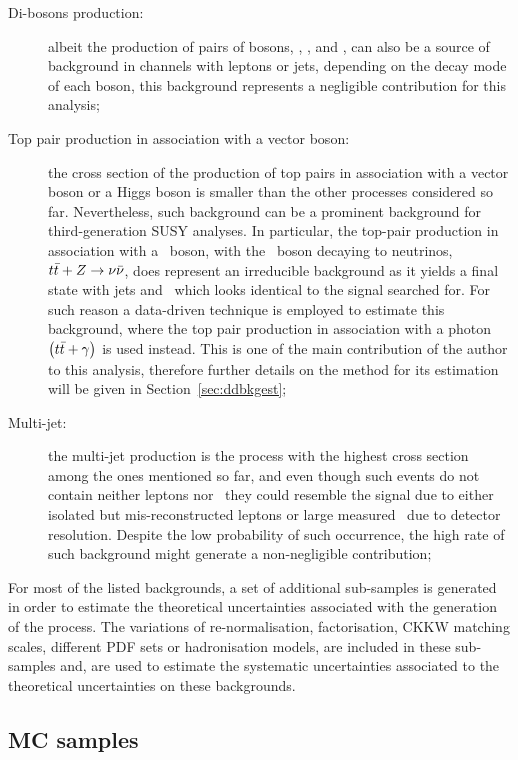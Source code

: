 \begin{description}
			\item [Di-bosons production:] albeit the production of pairs of bosons, \Wboson\Wboson, \Wboson\Zboson, and \Zboson\Zboson, can also be a source of background in channels with leptons or jets, depending on the decay mode of each boson, this background represents a negligible contribution for this analysis;

			\item [Top pair production in association with a vector boson:] the cross section of the production of top pairs in association with a vector boson or a Higgs boson is smaller than the other processes considered so far. Nevertheless, such background can be a prominent background for third-generation \ac{SUSY} analyses. In particular, the top-pair production in association with a \Zboson\ boson, with the \Zboson\ boson decaying to neutrinos, $t\bar{t}+Z \rightarrow \nu \bar{\nu}$, does represent an irreducible background as it yields a final state with jets and \met\ which looks identical to the signal searched for. For such reason a data-driven technique is employed to estimate this background, where the top pair production in association with a photon $\left(t\bar{t}+\gamma\right)$ is used instead. This is one of the main contribution of the author to this analysis, therefore further details on the method for its estimation will be given in Section~\ref{sec:ddbkgest}; 

			\item [Multi-jet:] the multi-jet production is the process with the highest cross section among the ones mentioned so far, and even though such events do not contain neither leptons nor \met\ they could resemble the signal due to either isolated but mis-reconstructed leptons or large measured \met\ due to detector resolution. Despite the low probability of such occurrence, the high rate of such background might generate a non-negligible contribution;
		\end{description}

		\noindent For most of the listed backgrounds, a set of additional sub-samples is generated in order to estimate the theoretical uncertainties associated with the generation of the process. The variations of re-normalisation, factorisation, \ac{CKKW} matching scales, different \ac{PDF} sets or hadronisation models, are included in these sub-samples and, are used to estimate the systematic uncertainties associated to the theoretical uncertainties on these backgrounds.

		\subsection{MC samples}
		\label{subsec:mc_samples}

